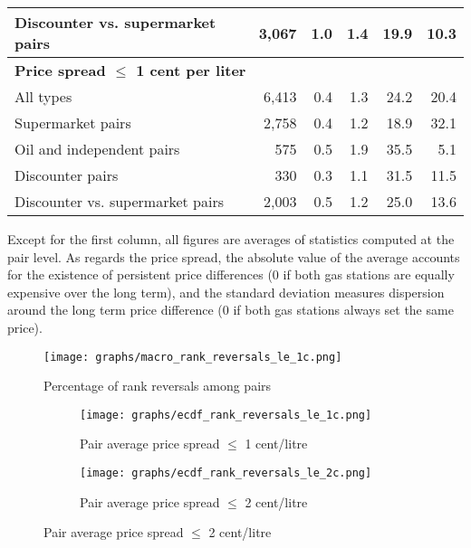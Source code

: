 \documentclass[english]{article}
\begin{document}
\begin{table}[H]
\begin{threeparttable}
\begin{tabular}{lrrrrr}
Discounter vs. supermarket pairs & 3,067 & 1.0   & 1.4   & 19.9  & 10.3 \\
\hline
\multicolumn{2}{l}{\textbf{Price spread $\le$ 1 cent per liter}} &       &       &       &  \\
All types & 6,413 & 0.4   & 1.3   & 24.2  & 20.4 \\
Supermarket pairs & 2,758 & 0.4   & 1.2   & 18.9  & 32.1 \\
Oil and independent pairs & 575   & 0.5   & 1.9   & 35.5  & 5.1 \\
Discounter pairs & 330   & 0.3   & 1.1   & 31.5  & 11.5 \\
Discounter vs. supermarket pairs & 2,003 & 0.5   & 1.2   & 25.0  & 13.6 \\
\hline
\hline
\end{tabular}
\begin{tablenotes}
			\small
      \item Except for the first column, all figures are averages of statistics computed at the pair level. As regards the price spread, the absolute value of the average accounts for the existence of persistent price differences (0 if both gas stations are equally expensive over the long term), and the standard deviation measures dispersion around the long term price difference (0 if both gas stations always set the same price).
\end{tablenotes}
\end{threeparttable}
\end{table}

\begin{figure}[H]
    \caption{Percentage of rank reversals among pairs}
	\centering
		\texttt{[image: graphs/macro\_rank\_reversals\_le\_1c.png]}
\end{figure}

\begin{figure}[H]
\centering
\caption{Empirical distribution functions of rank reversals (raw prices)}
\begin{subfigure}{.49\textwidth}
\centering
\texttt{[image: graphs/ecdf\_rank\_reversals\_le\_1c.png]}
\caption[short]{Pair average price spread $\le$ 1 cent/litre}
\end{subfigure}
\begin{subfigure}{.49\textwidth}
\centering
\texttt{[image: graphs/ecdf\_rank\_reversals\_le\_2c.png]}
\caption[short]{Pair average price spread $\le$ 2 cent/litre}
\end{subfigure}
\end{figure}
\end{document}
